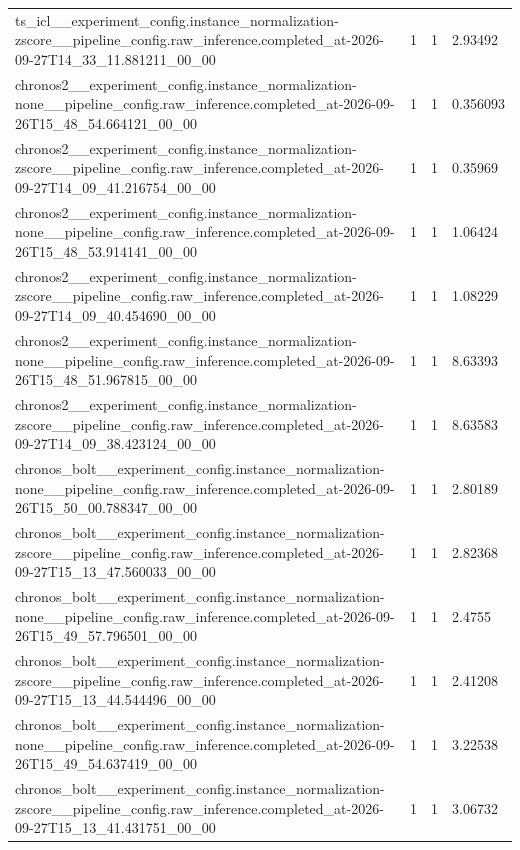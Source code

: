 \begin{tabular}{llll}
ts\_icl\_\_experiment\_config.instance\_normalization-zscore\_\_pipeline\_config.raw\_inference.completed\_at-2026-09-27T14\_33\_11.881211\_00\_00 & 1 & 1 & 2.93492 \\
chronos2\_\_experiment\_config.instance\_normalization-none\_\_pipeline\_config.raw\_inference.completed\_at-2026-09-26T15\_48\_54.664121\_00\_00 & 1 & 1 & 0.356093 \\
chronos2\_\_experiment\_config.instance\_normalization-zscore\_\_pipeline\_config.raw\_inference.completed\_at-2026-09-27T14\_09\_41.216754\_00\_00 & 1 & 1 & 0.35969 \\
chronos2\_\_experiment\_config.instance\_normalization-none\_\_pipeline\_config.raw\_inference.completed\_at-2026-09-26T15\_48\_53.914141\_00\_00 & 1 & 1 & 1.06424 \\
chronos2\_\_experiment\_config.instance\_normalization-zscore\_\_pipeline\_config.raw\_inference.completed\_at-2026-09-27T14\_09\_40.454690\_00\_00 & 1 & 1 & 1.08229 \\
chronos2\_\_experiment\_config.instance\_normalization-none\_\_pipeline\_config.raw\_inference.completed\_at-2026-09-26T15\_48\_51.967815\_00\_00 & 1 & 1 & 8.63393 \\
chronos2\_\_experiment\_config.instance\_normalization-zscore\_\_pipeline\_config.raw\_inference.completed\_at-2026-09-27T14\_09\_38.423124\_00\_00 & 1 & 1 & 8.63583 \\
chronos\_bolt\_\_experiment\_config.instance\_normalization-none\_\_pipeline\_config.raw\_inference.completed\_at-2026-09-26T15\_50\_00.788347\_00\_00 & 1 & 1 & 2.80189 \\
chronos\_bolt\_\_experiment\_config.instance\_normalization-zscore\_\_pipeline\_config.raw\_inference.completed\_at-2026-09-27T15\_13\_47.560033\_00\_00 & 1 & 1 & 2.82368 \\
chronos\_bolt\_\_experiment\_config.instance\_normalization-none\_\_pipeline\_config.raw\_inference.completed\_at-2026-09-26T15\_49\_57.796501\_00\_00 & 1 & 1 & 2.4755 \\
chronos\_bolt\_\_experiment\_config.instance\_normalization-zscore\_\_pipeline\_config.raw\_inference.completed\_at-2026-09-27T15\_13\_44.544496\_00\_00 & 1 & 1 & 2.41208 \\
chronos\_bolt\_\_experiment\_config.instance\_normalization-none\_\_pipeline\_config.raw\_inference.completed\_at-2026-09-26T15\_49\_54.637419\_00\_00 & 1 & 1 & 3.22538 \\
chronos\_bolt\_\_experiment\_config.instance\_normalization-zscore\_\_pipeline\_config.raw\_inference.completed\_at-2026-09-27T15\_13\_41.431751\_00\_00 & 1 & 1 & 3.06732 \\

\end{tabular}
